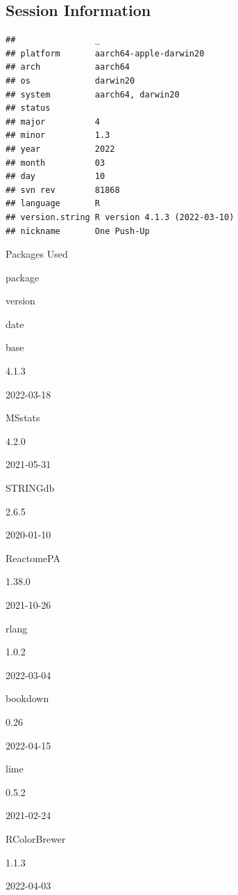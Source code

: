 \documentclass[9pt,lineno]{elife}
\newcommand{\beginsupplement}{\setcounter{table}{0}  \renewcommand{\thetable}{S\arabic{table}} \setcounter{figure}{0} \renewcommand{\thefigure}{S\arabic{figure}}}
\begin{document}
\begin{landscape}
\begin{landscape}
\beginsupplement

\hypertarget{session-information}{%
\subsection{Session Information}\label{session-information}}

\begin{verbatim}
##                _                           
## platform       aarch64-apple-darwin20      
## arch           aarch64                     
## os             darwin20                    
## system         aarch64, darwin20           
## status                                     
## major          4                           
## minor          1.3                         
## year           2022                        
## month          03                          
## day            10                          
## svn rev        81868                       
## language       R                           
## version.string R version 4.1.3 (2022-03-10)
## nickname       One Push-Up
\end{verbatim}

\label{tab:package-table}Packages Used

package

version

date

base

4.1.3

2022-03-18

MSstats

4.2.0

2021-05-31

STRINGdb

2.6.5

2020-01-10

ReactomePA

1.38.0

2021-10-26

rlang

1.0.2

2022-03-04

bookdown

0.26

2022-04-15

lime

0.5.2

2021-02-24

RColorBrewer

1.1.3

2022-04-03


\end{landscape}
\end{landscape}
\end{document}
